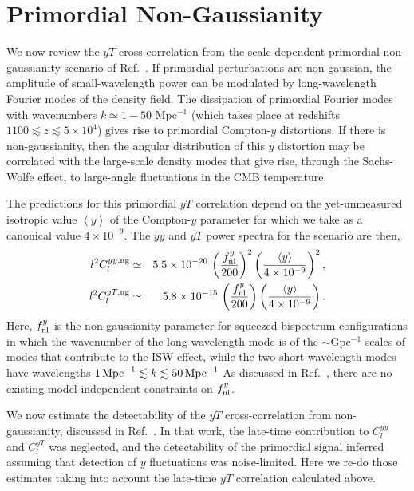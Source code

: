 \documentclass[aps,twocolumn,floats,prd,nofootinbib,10pt,floatfix]{revtex4-1}
\def\VEV#1{\left\langle #1 \right\rangle}
\begin{document}
\section{Primordial Non-Gaussianity}
\label{sec:ng}

We now review the $yT$ cross-correlation from the
scale-dependent primordial non-gaussianity scenario of
Ref.~\cite{Emami:2015xqa}.  If primordial perturbations are
non-gaussian, the amplitude of small-wavelength power can be
modulated by long-wavelength Fourier modes of the density
field.  The dissipation of primordial Fourier modes with
wavenumbers $k\simeq 1-50$ Mpc$^{-1}$ (which takes place at
redshifts $1100 \lesssim z \lesssim 5\times 10^4$) gives rise to
primordial Compton-$y$ distortions.  If there is non-gaussianity,
then the angular distribution of this $y$ distortion may be
correlated with the large-scale density modes that give rise,
through the Sachs-Wolfe effect, to large-angle fluctuations in
the CMB temperature.

The predictions for this primordial $yT$ correlation depend on the
yet-unmeasured isotropic value $\VEV{y}$ of the Compton-$y$
parameter for which we take as a canonical value $4\times
10^{-9}$.  The $yy$ and $yT$ power spectra for the scenario are
then, 
\begin{eqnarray}
     l^2 C_l^{yy,{\rm ng}} &\simeq& 5.5\times10^{-20} \, \left( \frac{
     f_{\rm nl}^y}{200} \right)^2 \left(\frac{\VEV{y}}{4\times
     10^{-9}} \right)^2, \\
     l^2 C_l^{yT,{\rm ng}} &\simeq& 5.8\times10^{-15} \, \left( \frac{
     f_{\rm nl}^y}{200} \right) \left(\frac{\VEV{y}}{4\times
     10^{-9}} \right).
\end{eqnarray}
Here, $f_{\rm nl}^y$ is the non-gaussianity parameter for
squeezed bispectrum configurations in which the wavenumber of
the long-wavelength mode is of the $\sim$Gpc$^{-1}$ scales of
modes that contribute to the ISW effect, while the two
short-wavelength modes have wavelengths $1\,{\rm Mpc}^{-1}
\lesssim k \lesssim 50\,{\rm Mpc}^{-1}$
As discussed in Ref.~\cite{Emami:2015xqa}, there are no
existing model-independent constraints on $f_{\rm nl}^y$.

We now estimate the detectability of the $yT$ cross-correlation
from non-gaussianity, discussed in Ref.~\cite{Emami:2015xqa}.
In that work, the late-time contribution to $C_l^{yy}$ and
$C_l^{yT}$ was neglected, and the detectability of the
primordial signal inferred assuming that detection of $y$
fluctuations was noise-limited.  Here we re-do those estimates
taking into account the late-time $yT$ correlation calculated
above.
\end{document}
